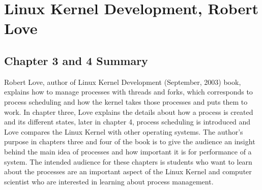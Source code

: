 \documentclass[letterpaper,10pt,draftclsnofoot,onecolumn]{IEEEtran}
\begin{document}
\section*{Linux Kernel Development, Robert Love}
\subsection*{Chapter 3 and 4 Summary}

Robert Love, author of Linux Kernel Development (September, 2003) book, explains how to manage processes with threads and forks, which corresponds to process scheduling and how the kernel takes those processes and puts them to work. In chapter three, Love explains the details about how a process is created and its different states, later in chapter 4, process scheduling is introduced and Love compares the Linux Kernel with other operating systems. The author’s purpose in chapters three and four of the book is to give the audience an insight behind the main idea of processes and how important it is for performance of a system. The intended audience for these chapters is students who want to learn about the processes are an important aspect of the Linux Kernel and computer scientist who are interested in learning about process management. 
\end{document}
